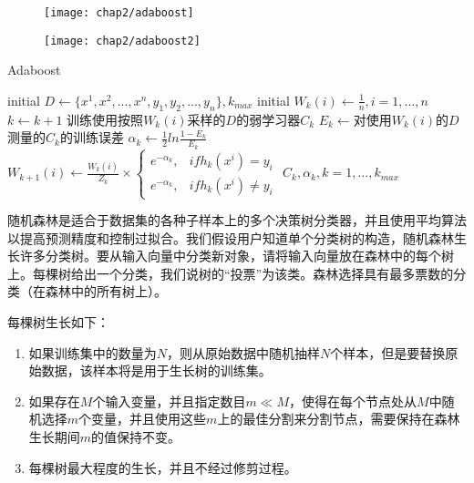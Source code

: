 \begin{figure}[!htp]
    \centering
    \texttt{[image: chap2/adaboost]}
\end{figure}

\begin{figure}[!htp]
    \centering
    \texttt{[image: chap2/adaboost2]}
\end{figure}

\begin{algorithm}
    \caption{Adaboost}
    \label{algo:ada}
    \begin{algorithmic}[1]
    \State initial $D \gets \{ x^1, x^2, ..., x^n, y_{1}, y_{2}, ..., y_{n}\}, k_{max}$
    \State initial $W_{k}(i) \gets \frac{1}{n}, i=1,...,n$
        \State $k \gets k+1$
        \State 训练使用按照$W_{k}(i)$采样的$D$的弱学习器$C_{k}$
        \State $E_{k} \gets$对使用$W_{k}(i)$的$D$测量的$C_{k}$的训练误差 
        \State $\alpha_{k} \gets \frac{1}{2}ln\frac{1-E_{k}}{E_{k}}$
        \State $W_{k+1}(i) \gets \frac{W_{k}(i)}{Z_{k}} \times \begin{cases}
            e^{-\alpha_{k}}, & if h_{k}(x^i)=y_{i} \\
            e^{-\alpha_{k}}, & if h_{k}(x^i)\neq y_{i}
        \end{cases}$
    \EndFor
    \State 
    \Return $C_{k},\alpha_{k},k=1,...,k_{max}$
    \end{algorithmic}
\end{algorithm}

随机森林是适合于数据集的各种子样本上的多个决策树分类器，并且使用平均算法以提高预测精度和控制过拟合。我们假设用户知道单个分类树的构造，随机森林生长许多分类树。要从输入向量中分类新对象，请将输入向量放在森林中的每个树上。每棵树给出一个分类，我们说树的“投票”为该类。森林选择具有最多票数的分类（在森林中的所有树上）。

每棵树生长如下：
\begin{enumerate}
    \item 如果训练集中的数量为$N$，则从原始数据中随机抽样$N$个样本，但是要替换原始数据，该样本将是用于生长树的训练集。
    \item 如果存在$M$个输入变量，并且指定数目$m \ll M$，使得在每个节点处从$M$中随机选择$m$个变量，并且使用这些$m$上的最佳分割来分割节点，需要保持在森林生长期间$m$的值保持不变。
    \item 每棵树最大程度的生长，并且不经过修剪过程。
\end{enumerate}


